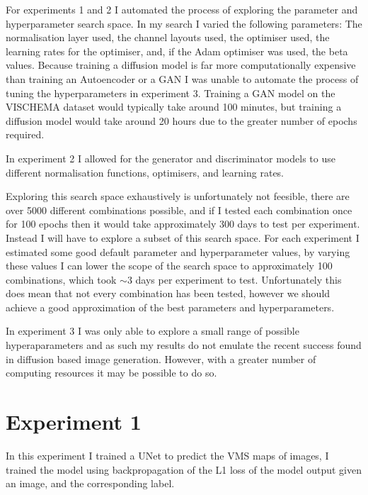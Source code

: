 \documentclass{UoYCSproject}
\begin{document}
For experiments 1 and 2 I automated the process of exploring the parameter and hyperparameter search space. In my search I varied the following parameters: The normalisation layer used, the channel layouts used, the optimiser used, the learning rates for the optimiser, and, if the Adam optimiser was used, the beta values. Because training a diffusion model is far more computationally expensive than training an Autoencoder or a GAN I was unable to automate the process of tuning the hyperparameters in experiment 3. Training a GAN model on the VISCHEMA dataset would typically take around 100 minutes, but training a diffusion model would take around 20 hours due to the greater number of epochs required.


In experiment 2 I allowed for the generator and discriminator models to use different normalisation functions, optimisers, and learning rates. 


Exploring this search space exhaustively is unfortunately not feesible, there are over 5000 different combinations possible, and if I tested each combination once for 100 epochs then it would take approximately 300 days to test per experiment.
Instead I will have to explore a subset of this search space. For each experiment I estimated some good default parameter and hyperparameter values, by varying these values I can lower the scope of the search space to 
approximately 100 combinations, which took \(\sim\)3 days per experiment to test. Unfortunately this does mean that not every combination has been tested, however we should achieve a good approximation of the best parameters and hyperparameters.


In experiment 3 I was only able to explore a small range of possible hyperaparameters and as such my results do not emulate the recent success found in diffusion based image generation.
However, with a greater number of computing resources it may be possible to do so.

\section{Experiment 1}

In this experiment I trained a UNet to predict the VMS maps of images, I trained the model using backpropagation of the L1 loss of the model output given an image, and the corresponding label. 
\end{document}
